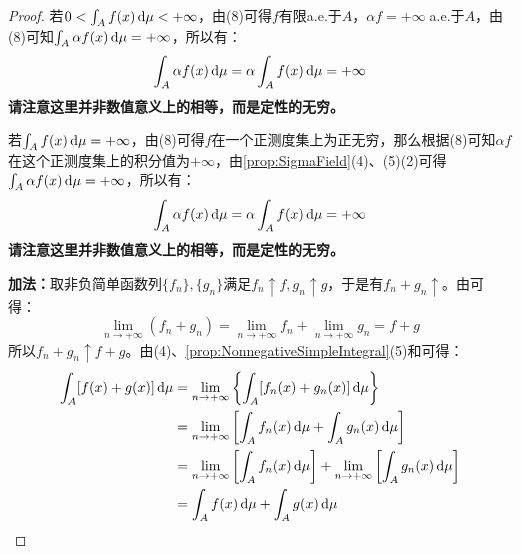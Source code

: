 \begin{proof}
	若$0<\int_{A}f(x)\mathop{}\!\mathrm{d}\mu<+\infty$，由(8)可得$f$有限a.e.于$A$，$\alpha f=+\infty\;$a.e.于$A$，由(8)可知$\int_{A}\alpha f(x)\mathop{}\!\mathrm{d}\mu=+\infty$，所以有：
	\begin{equation*}
		\int_{A}\alpha f(x)\mathop{}\!\mathrm{d}\mu=\alpha\int_{A}f(x)\mathop{}\!\mathrm{d}\mu=+\infty
	\end{equation*}
	\textbf{请注意这里并非数值意义上的相等，而是定性的无穷。}\par
	若$\int_{A}f(x)\mathop{}\!\mathrm{d}\mu=+\infty$，由(8)可得$f$在一个正测度集上为正无穷，那么根据(8)可知$\alpha f$在这个正测度集上的积分值为$+\infty$，由\cref{prop:SigmaField}(4)、(5)(2)可得$\int_{A}\alpha f(x)\mathop{}\!\mathrm{d}\mu=+\infty$，所以有：
	\begin{equation*}
		\int_{A}\alpha f(x)\mathop{}\!\mathrm{d}\mu=\alpha\int_{A}f(x)\mathop{}\!\mathrm{d}\mu=+\infty
	\end{equation*}
	\textbf{请注意这里并非数值意义上的相等，而是定性的无穷。}\par
	\textbf{加法：}取非负简单函数列$\{f_n\},\{g_n\}$满足$f_n\uparrow f,g_n\uparrow g$，于是有$f_n+g_n\uparrow$。由可得：
	\begin{equation*}
		\lim_{n\to+\infty}(f_n+g_n)=\lim_{n\to+\infty}f_n+\lim_{n\to+\infty}g_n=f+g
	\end{equation*}
	所以$f_n+g_n\uparrow f+g$。由(4)、\cref{prop:NonnegativeSimpleIntegral}(5)和可得：
	\begin{align*}
		\int_{A}[f(x)+g(x)]\dif\mu
		&=\lim_{n\to+\infty}\left\{\int_{A}[f_n(x)+g_n(x)]\dif\mu\right\} \\
		&=\lim_{n\to+\infty}\left[\int_{A}f_n(x)\dif\mu+\int_{A}g_n(x)\dif\mu\right] \\
		&=\lim_{n\to+\infty}\left[\int_{A}f_n(x)\dif\mu\right]+\lim_{n\to+\infty}\left[\int_{A}g_n(x)\dif\mu\right] \\
		&=\int_{A}f(x)\dif\mu+\int_{A}g(x)\dif\mu\qedhere
	\end{align*}
\end{proof}

